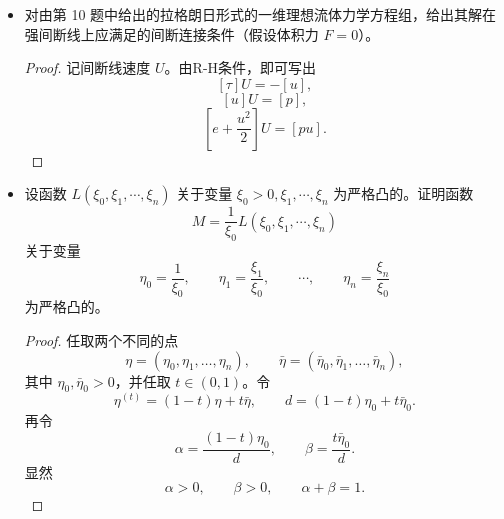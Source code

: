 \begin{itemize}
    \begin{proof}
        要验证
    $$
    \begin{cases}
    \displaystyle\frac{\partial\tau}{\partial t}
    -\frac{\partial u}{\partial x}=0,\\[2mm]
    \displaystyle\frac{\partial u}{\partial t}
    +\frac{\partial p}{\partial x}=F,\\[2mm]
    \displaystyle\frac{\partial s}{\partial t}=0
    \end{cases}
    \quad\Longleftrightarrow\quad
    \begin{cases}
    \displaystyle\frac{\partial\tau}{\partial t}
    -\frac{\partial u}{\partial x}=0,\\[2mm]
    \displaystyle\frac{\partial u}{\partial t}
    +\frac{\partial p}{\partial x}=F,\\[2mm]
    \displaystyle\frac{\partial}{\partial t}
    \left(e+\frac{u^2}{2}\right)
    +\frac{\partial}{\partial x}(pu)=Fu.
    \end{cases}
    $$
    由热力学基本微分方程：
    $$
    \mathrm de=T\,\mathrm ds-p\,\mathrm d\tau
    \quad\Longrightarrow\quad
    \frac{\partial e}{\partial t}
    =T\frac{\partial s}{\partial t}
    -p\frac{\partial\tau}{\partial t}
    =-p\frac{\partial u}{\partial x}.
    $$
    代入验证即得。
    \end{proof}

    \item[11.]对由第 10 题中给出的拉格朗日形式的一维理想流体力学方程组，给出其解在强间断线上应满足的间断连接条件（假设体积力 $F=0$）。

    \begin{proof}
    记间断线速度 $U$。由R-H条件，即可写出
    $$
    [\tau]U=-[u],
    $$
    $$
    [u]U=[p],
    $$
    $$
    \left[e+\frac{u^2}{2}\right]U=[pu].
    $$
    \end{proof}

    \item[12.]设函数 $L(\xi_0,\xi_1,\cdots,\xi_n)$ 关于变量 $\xi_0>0,\xi_1,\cdots,\xi_n$ 为严格凸的。证明函数
    $$
    M=\frac{1}{\xi_0}L(\xi_0,\xi_1,\cdots,\xi_n)
    $$
    关于变量
    $$
    \eta_0=\frac{1}{\xi_0},\qquad
    \eta_1=\frac{\xi_1}{\xi_0},\qquad
    \cdots,\qquad
    \eta_n=\frac{\xi_n}{\xi_0}
    $$
    为严格凸的。


\begin{proof}


任取两个不同的点
\[
\eta=(\eta_0,\eta_1,\ldots,\eta_n),
\qquad
\bar\eta=(\bar\eta_0,\bar\eta_1,\ldots,\bar\eta_n),
\]
其中 $\eta_0,\bar\eta_0>0$，并任取 $t\in(0,1)$。令
\[
\eta^{(t)}=(1-t)\eta+t\bar\eta,
\qquad
d=(1-t)\eta_0+t\bar\eta_0.
\]
再令
\[
\alpha=\frac{(1-t)\eta_0}{d},
\qquad
\beta=\frac{t\bar\eta_0}{d}.
\]
显然
\[
\alpha>0,
\qquad
\beta>0,
\qquad
\alpha+\beta=1.
\]


\end{proof}
\end{itemize}
